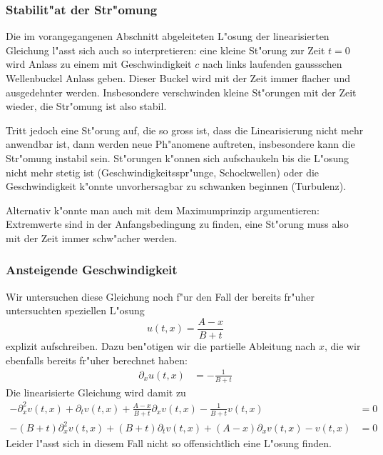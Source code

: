 \subsubsection{Stabilit"at der Str"omung}
Die im vorangegangenen Abschnitt abgeleiteten L"osung der linearisierten
Gleichung l"asst sich auch so interpretieren: eine kleine St"orung zur Zeit
$t=0$ wird Anlass zu einem mit Geschwindigkeit $c$ nach links
laufenden gaussschen Wellenbuckel Anlass geben. Dieser Buckel wird mit
der Zeit immer flacher und ausgedehnter werden. Insbesondere verschwinden
kleine St"orungen mit der Zeit wieder, die Str"omung ist also stabil.

Tritt jedoch eine St"orung auf, die so gross ist, dass die Linearisierung
nicht mehr anwendbar ist, dann werden neue Ph"anomene auftreten, insbesondere kann
die Str"omung instabil sein. St"orungen k"onnen sich aufschaukeln bis die
L"osung nicht mehr stetig ist (Geschwindigkeitsspr"unge, Schockwellen)
oder die Geschwindigkeit k"onnte unvorhersagbar zu schwanken beginnen
(Turbulenz).

Alternativ k"onnte man auch mit dem Maximumprinzip argumentieren: Extremwerte
sind in der Anfangsbedingung zu finden, eine St"orung muss also mit der
Zeit immer schw"acher werden.

\subsubsection{Ansteigende Geschwindigkeit}
Wir untersuchen diese Gleichung noch f"ur den Fall der bereits 
fr"uher untersuchten speziellen L"osung 
\[
u(t,x)=\frac{A-x}{B+t}
\]
explizit aufschreiben. Dazu ben"otigen wir die partielle Ableitung
nach $x$, die wir ebenfalls bereits fr"uher berechnet haben:
\begin{align*}
\partial_x u(t,x)&=-\frac{1}{B+t}
\end{align*}
Die linearisierte Gleichung wird damit zu
\begin{align*}
-\partial_x^2v(t,x)
+\partial_tv(t,x)
+ \frac{A-x}{B+t}\partial_xv(t,x)
-\frac{1}{B+t} v(t,x)
&=0
\\
-(B+t)\partial_x^2v(t,x)
+(B+t)\partial_tv(t,x)
+ (A-x)\partial_xv(t,x)
- v(t,x)
&=0
\end{align*}
Leider l"asst sich in diesem Fall nicht so offensichtlich eine L"osung finden.

